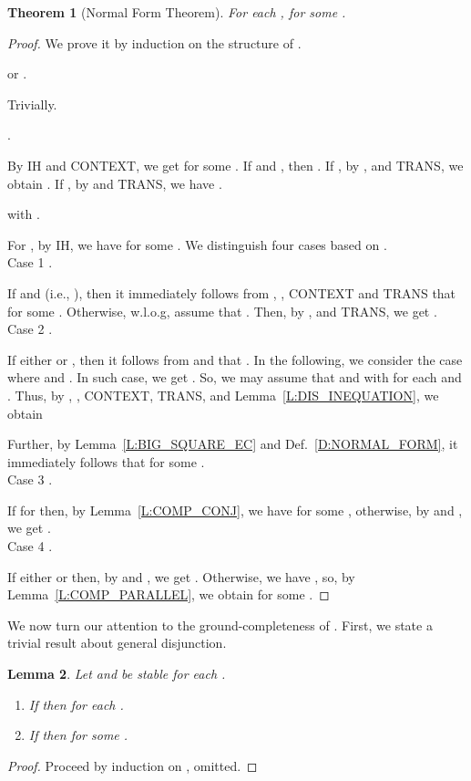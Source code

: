 \documentclass{elsarticle}
\theoremstyle{plain}
\newtheorem{theorem}{Theorem}[section]
\newtheorem{lemma}[theorem]{Lemma}
\theoremstyle{definition}
\begin{document}
\begin{theorem}[Normal Form Theorem]\label{T:NORMALFORM}
  For each ,    for some .
\end{theorem}
\begin{proof}
  We prove it by induction on the structure of  .

\noindent   or .

    Trivially.

\noindent  .

        By IH and CONTEXT, we get  for some .
        If  and , then .
        If , by  ,  and TRANS, we obtain .
        If , by  and TRANS, we have  .

\noindent   with .

        For , by IH, we have  for some . We distinguish four cases based on .\\

\noindent Case 1 .

        If    and   (i.e., ), then it immediately follows from , , CONTEXT and TRANS that  for some .
        Otherwise, w.l.o.g, assume that .
        Then, by ,  and TRANS, we get .\\

\noindent Case 2 .

        If either  or ,  then it follows from  and  that .
        In the following, we consider the case where  and .
        In such case, we get .
        So, we may assume that  and  with  for each  and .
        Thus, by , , CONTEXT, TRANS,  and Lemma~\ref{L:DIS_INEQUATION},  we obtain
        
        Further, by Lemma~\ref{L:BIG_SQUARE_EC} and Def.~\ref{D:NORMAL_FORM}, it immediately follows that  for some .\\

\noindent Case 3 .

         If  for  then, by Lemma~\ref{L:COMP_CONJ}, we have  for some , otherwise, by  and , we get .\\

\noindent Case 4 .

        If either  or  then, by  and , we get .
        Otherwise,  we have , so, by Lemma~\ref{L:COMP_PARALLEL}, we obtain  for some .
\end{proof}

We now turn our attention to the ground-completeness of .
First, we state a trivial result about general disjunction.

\begin{lemma}\label{L:SUBSTRUCTURE}
  Let  and  be stable for each .
  \begin{enumerate}
    \item If  then  for each .
    \item If  then  for some .
  \end{enumerate}
\end{lemma}
\begin{proof}
Proceed by induction on , omitted.
\end{proof}
\end{document}

